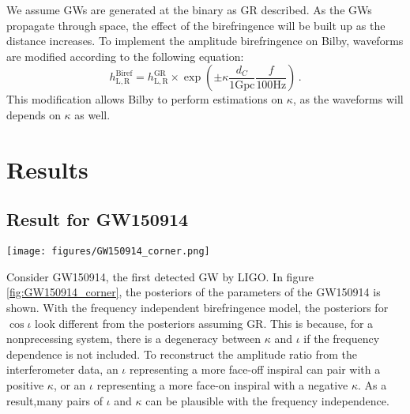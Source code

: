 \documentclass[twocolumn]{aastex631}
\begin{document}
We assume GWs are generated at the binary as GR described. As the GWs propagate through space,
the effect of the birefringence will be built up as the distance increases.
To implement the amplitude birefringence on Bilby, waveforms are modified according to the following equation:
\begin{equation}
    h_\mathrm{L,R}^{\mathrm{Biref}}=
    h_\mathrm{L,R}^{\mathrm{GR}}\times
    \exp\left(\pm\kappa\frac{d_C}{1\mathrm{ Gpc}}\frac{f}{100\mathrm{ Hz}}\right)\,.
\end{equation}
This modification allows Bilby to perform estimations on $\kappa$, as the waveforms will depends on $\kappa$ as well.

\section{Results}

\subsection{Result for GW150914}

\begin{figure*}[h]
    \texttt{[image: figures/GW150914\_corner.png]}
    \caption{The posterior of $\kappa$, luminosity distance $d_L$ and $\cos{\iota}$ for GW150914.
    The three sets of plots are the PEs done by LIGO with GR \citep{LIGO_2021},
    the PE done by us with the frequency independent birefringence and the frequency dependent birefringence respectively.
    Note that there is no posterior of $\kappa$ for the PE from LIGO, as the LIGO PE is based on GR,
    which does not suggest GW amplitude birefringence.}
    \label{fig:GW150914_corner}
\end{figure*}

Consider GW150914, the first detected GW by LIGO. In figure \ref{fig:GW150914_corner}, the posteriors of the parameters of the GW150914 is shown.
With the frequency independent birefringence model, the posteriors for $\cos\iota$ look different from the posteriors assuming GR.
This is because, for a nonprecessing system, there is a degeneracy between $\kappa$ and $\iota$ if the frequency dependence is not included.
To reconstruct the amplitude ratio from the interferometer data, an $\iota$ representing a more face-off inspiral can pair with a positive $\kappa$,
or an $\iota$ representing a more face-on inspiral with a negative $\kappa$.
As a result,many pairs of $\iota$ and $\kappa$ can be plausible with the frequency independence.
\end{document}
